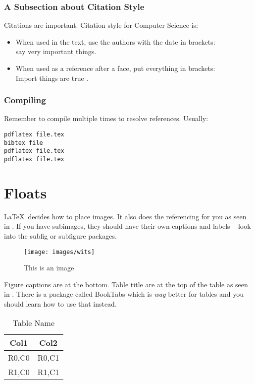 \documentclass[a4paper,twoside,12pt]{report}
\begin{document}
\subsection{A Subsection about Citation Style}
Citations are important. Citation style for Computer Science is:
\begin{itemize}
\item When used in the text, use the authors with the date in brackets:\\ \citet{klein17} say very important things.
\item When used as a reference after a face, put everything in brackets:\\ Import things are true \citep{klein17}.
\end{itemize}

\subsection{Compiling}
Remember to compile multiple times to resolve references. Usually:
\begin{verbatim}
pdflatex file.tex
bibtex file
pdflatex file.tex
pdflatex file.tex
\end{verbatim}


\chapter{Floats}
\LaTeX\ decides how to place images. It also does the referencing for you as seen in . If you have subimages, they should have their own captions and labels -- look into the subfig or subfigure packages.

\begin{figure}[ht]
	\centering
	\texttt{[image: images/wits]}
	\caption{This is an image}
	\label{fig:thing1}
\end{figure}

Figure captions are at the bottom. Table title are at the top of the table as seen in . There is a package called BookTabs which is \textit{way} better for tables and you should learn how to use that instead.

\begin{table}[p]
	\centering
	\caption{Table Name}
	\label{tab:tab1}
\begin{tabular}{cc}
	\hline
	Col1 & Col2\\
	\hline\hline 
	R0,C0 & R0,C1 \\ 
	R1,C0 & R1,C1 \\ 
	\hline
\end{tabular} 
\end{table}
\end{document}
